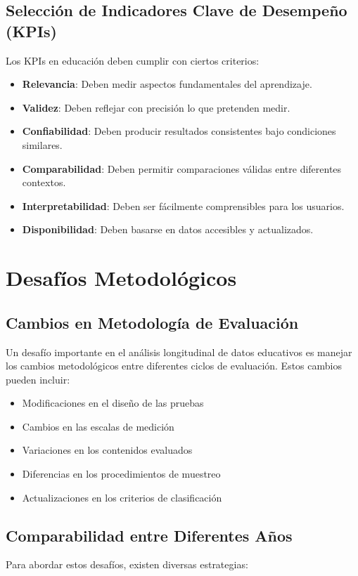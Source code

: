 \subsection{Selección de Indicadores Clave de Desempeño (KPIs)}
Los KPIs en educación deben cumplir con ciertos criterios:

\begin{itemize}
    \item \textbf{Relevancia}: Deben medir aspectos fundamentales del aprendizaje.
    \item \textbf{Validez}: Deben reflejar con precisión lo que pretenden medir.
    \item \textbf{Confiabilidad}: Deben producir resultados consistentes bajo condiciones similares.
    \item \textbf{Comparabilidad}: Deben permitir comparaciones válidas entre diferentes contextos.
    \item \textbf{Interpretabilidad}: Deben ser fácilmente comprensibles para los usuarios.
    \item \textbf{Disponibilidad}: Deben basarse en datos accesibles y actualizados.
\end{itemize}

\section{Desafíos Metodológicos}

\subsection{Cambios en Metodología de Evaluación}
Un desafío importante en el análisis longitudinal de datos educativos es manejar los cambios metodológicos entre diferentes ciclos de evaluación. Estos cambios pueden incluir:

\begin{itemize}
    \item Modificaciones en el diseño de las pruebas
    \item Cambios en las escalas de medición
    \item Variaciones en los contenidos evaluados
    \item Diferencias en los procedimientos de muestreo
    \item Actualizaciones en los criterios de clasificación
\end{itemize}

\subsection{Comparabilidad entre Diferentes Años}
Para abordar estos desafíos, existen diversas estrategias:

